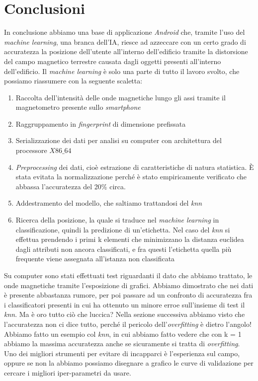 \section{Conclusioni}
In conclusione abbiamo una base di applicazione \textit{Android} che, tramite l'uso del \textit{machine learning}, una branca dell'IA, riesce ad azzeccare con un certo grado di accuratezza la posizione dell'utente all'interno dell'edificio tramite la distorsione del campo magnetico terrestre causata dagli oggetti presenti all'interno dell'edificio. Il \textit{machine learning} \`e solo una parte di tutto il lavoro svolto, che possiamo riassumere con la seguente scaletta:
\begin{enumerate}
	\item Raccolta dell'intensit\`a delle onde magnetiche lungo gli assi tramite il magnetometro presente sullo \textit{smartphone}
	\item Raggruppamento in \textit{fingerprint} di dimensione prefissata
	\item Serializzazione dei dati per analisi su computer con architettura del processore $X86\_64$
	\item \textit{Preprocessing} dei dati, cio\`e  estrazione di caratteristiche di natura statistica. \`E stata evitata la normalizzazione perch\'e \`e stato empiricamente verificato che abbassa l'accuratezza del 20\% circa.
	\item Addestramento del modello, che saltiamo trattandosi del \textit{knn}
	\item Ricerca della posizione, la quale si traduce nel \textit{machine learning} in classificazione, quindi la predizione di un'etichetta. Nel caso del \textit{knn} si effettua prendendo i primi k elementi che minimizzano la distanza euclidea dagli attributi non ancora classificati, e fra questi l'etichetta quella pi\`u frequente viene assegnata all'istanza non classificata 
\end{enumerate}
Su computer sono stati effettuati test riguardanti il dato che abbiamo trattato, le onde magnetiche tramite l'esposizione di grafici. Abbiamo dimostrato che nei dati \`e presente abbastanza rumore, per poi passare ad un confronto di accuratezza fra i classificatori presenti in cui ha ottenuto un minore erroe sull'insieme di test il \textit{knn}. Ma \`e oro tutto ci\`o che luccica? Nella sezione successiva abbiamo visto che l'accuratezza non ci dice tutto, perch\'e il pericolo dell'\textit{overfitting} \`e dietro l'angolo! Abbiamo fatto un esempio col \textit{knn}, in cui abbiamo fatto vedere che con k = 1 abbiamo la massima accuratezza anche se sicuramente si tratta di \textit{overfitting}. Uno dei migliori strumenti per evitare di incapparci \`e l'esperienza sul campo, oppure se non la abbiamo possiamo disegnare a grafico le curve di validazione per cercare i migliori iper-parametri da usare.